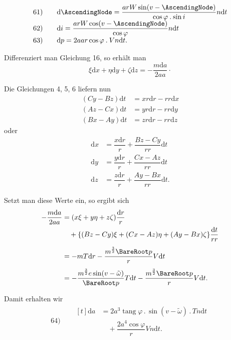 \[
\begin{array}{rl}
61)\quad&\mathrm{d}\AscendingNode=\dfrac{arW\sin(v-\AscendingNode)}{\cos\varphi\mathbin{.}\sin i}n\mathrm{d}t\\[5pt]
62)\quad&\mathrm{d}i=\dfrac{arW\cos(v-\AscendingNode)}{\cos\varphi}n\mathrm{d}t\\[5pt]
63)\quad&\mathrm{d}p=2aar\cos\varphi\mathbin{.}Vn\mathrm{d}t.
\end{array}
\]
\par Differenziert man Gleichung 16, so erhält man
\[
\xi\mathrm{d}x+\eta\mathrm{d}y+\zeta\mathrm{d}z=-\dfrac{m\mathrm{d}a}{2aa}\mathpunct{\cdot}
\]
\par Die Gleichungen 4, 5, 6 liefern nun
\[
\begin{aligned}
(Cy-Bz)\mathrm{d}t&=xr\mathrm{d}r-rr\mathrm{d}x\\
(Az-Cx)\mathrm{d}t&=yr\mathrm{d}r-rr\mathrm{d}y\\
(Bx-Ay)\mathrm{d}t&=zr\mathrm{d}r-rr\mathrm{d}z
\end{aligned}
\]
oder
\[
\begin{aligned}
\mathrm{d}x&=\dfrac{x\mathrm{d}r}{r}+\dfrac{Bz-Cy}{rr}\mathrm{d}t\\[4pt]
\mathrm{d}y&=\dfrac{y\mathrm{d}r}{r}+\dfrac{Cx-Az}{rr}\mathrm{d}t\\[4pt]
\mathrm{d}z&=\dfrac{z\mathrm{d}r}{r}+\dfrac{Ay-Bx}{rr}\mathrm{d}t.
\end{aligned}
\]
\par Setzt man diese Werte ein, so ergibt sich
\[
\begin{aligned}
-\dfrac{m\mathrm{d}a}{2aa}&=(x\xi+y\eta+z\zeta)\dfrac{\mathrm{d}r}{r}\\
&\quad+\{(Bz-Cy)\xi+(Cx-Az)\eta+(Ay-Bx)\zeta\}\dfrac{\mathrm{d}t}{rr}\\[4pt]
&=-mT\mathrm{d}r-\dfrac{m^{\frac32}\BareRoot p}{r}V\mathrm{d}t\\[4pt]
&=-\dfrac{m^{\frac32}e\sin(v-\tilde\omega)}{\BareRoot p}T\mathrm{d}t-\dfrac{m^{\frac32}\BareRoot p}{r}V\mathrm{d}t.
\end{aligned}
\]
\par Damit erhalten wir
\[
\begin{array}{rl}
64)\quad&\begin{aligned}[t]\mathrm{d}a&=2a^3\operatorname{tang}\varphi\mathbin{.}\sin(v-\tilde\omega)\mathbin{.}Tn\mathrm{d}t\\&\quad+\dfrac{2a^4\cos\varphi}{r}Vn\mathrm{d}t.\end{aligned}
\end{array}
\]
